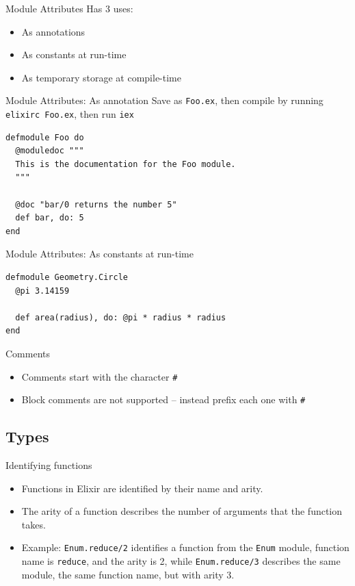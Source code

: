 \documentclass[12pt]{beamer}
\begin{document}
\begin{frame}{Module Attributes}
  Has 3 uses:
  \begin{itemize}
    \item As annotations
    \item As constants at run-time
    \item As temporary storage at compile-time
  \end{itemize}
\end{frame}

\begin{frame}[fragile]{Module Attributes: As annotation}
  Save as \texttt{Foo.ex}, then compile by running \texttt{elixirc Foo.ex}, then run \texttt{iex}
  \begin{verbatim}
defmodule Foo do
  @moduledoc """
  This is the documentation for the Foo module.
  """

  @doc "bar/0 returns the number 5"
  def bar, do: 5
end
  \end{verbatim}
\end{frame}

\begin{frame}[fragile]{Module Attributes: As constants at run-time}
  \begin{verbatim}
defmodule Geometry.Circle
  @pi 3.14159

  def area(radius), do: @pi * radius * radius
end
  \end{verbatim}
\end{frame}

\begin{frame}{Comments}
  \begin{itemize}
    \item Comments start with the character \texttt{\#}
    \item Block comments are not supported -- instead prefix each one with \texttt{\#}
  \end{itemize}
\end{frame}

\subsection{Types}
\begin{frame}[fragile]{Identifying functions}
  \begin{itemize}
    \item Functions in Elixir are identified by their name and arity.
    \item The arity of a function describes the number of arguments that the function takes.
    \item Example: \texttt{Enum.reduce/2} identifies a function from the \texttt{Enum} module, function name is \texttt{reduce}, and the arity is 2, while \texttt{Enum.reduce/3} describes the same module, the same function name, but with arity 3.
  \end{itemize}
\end{frame}
\end{document}
